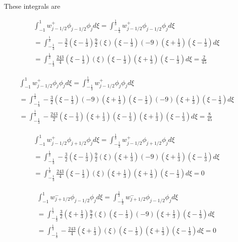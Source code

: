\documentclass[12pt]{article}
\begin{document}
These integrals are

\begin{multline*}
\int_{-1}^{1}w^+_{j - 1/2}\phi_{j - 1/2}\phi_{j} d\xi = \int_{-\frac{1}{3}}^{\frac{1}{3}}w^+_{j - 1/2}\phi_{j - 1/2}\phi_{j} d\xi \\= \int_{-\frac{1}{3}}^{\frac{1}{3}}-\frac{3}{2}\left(\xi - \frac{1}{3}\right) \frac{9}{2}\left(\xi\right)\left(\xi - \frac{1}{3}\right)(-9)\left(\xi + \frac{1}{3}\right)\left(\xi - \frac{1}{3}\right) d\xi \\= \int_{-\frac{1}{3}}^{\frac{1}{3}}\frac{243}{4}\left(\xi - \frac{1}{3}\right) \left(\xi\right)\left(\xi - \frac{1}{3}\right)\left(\xi + \frac{1}{3}\right)\left(\xi - \frac{1}{3}\right) d\xi = \frac{2}{45}
\end{multline*}

\begin{multline*}
\int_{-1}^{1}w^+_{j - 1/2}\phi_{j}\phi_{j} d\xi = \int_{-\frac{1}{3}}^{\frac{1}{3}}w^+_{j - 1/2}\phi_{j}\phi_{j} d\xi \\= \int_{-\frac{1}{3}}^{\frac{1}{3}}-\frac{3}{2}\left(\xi - \frac{1}{3}\right) (-9)\left(\xi + \frac{1}{3}\right)\left(\xi - \frac{1}{3}\right)(-9)\left(\xi + \frac{1}{3}\right)\left(\xi - \frac{1}{3}\right) d\xi \\= \int_{-\frac{1}{3}}^{\frac{1}{3}}-\frac{243}{2}\left(\xi - \frac{1}{3}\right) \left(\xi + \frac{1}{3}\right)\left(\xi - \frac{1}{3}\right)\left(\xi + \frac{1}{3}\right)\left(\xi - \frac{1}{3}\right) d\xi = \frac{8}{45}
\end{multline*}

\begin{multline*}
\int_{-1}^{1}w^+_{j - 1/2}\phi_{j + 1/2}\phi_{j} d\xi = \int_{-\frac{1}{3}}^{\frac{1}{3}}w^+_{j - 1/2}\phi_{j + 1/2}\phi_{j} d\xi \\= \int_{-\frac{1}{3}}^{\frac{1}{3}}-\frac{3}{2}\left(\xi - \frac{1}{3}\right) \frac{9}{2}\left(\xi\right)\left(\xi + \frac{1}{3}\right)(-9)\left(\xi + \frac{1}{3}\right)\left(\xi - \frac{1}{3}\right) d\xi \\= \int_{-\frac{1}{3}}^{\frac{1}{3}}\frac{243}{4}\left(\xi - \frac{1}{3}\right) \left(\xi\right)\left(\xi + \frac{1}{3}\right)\left(\xi + \frac{1}{3}\right)\left(\xi - \frac{1}{3}\right) d\xi = 0
\end{multline*}

%
\begin{multline*}
\int_{-1}^{1}w^-_{j + 1/2}\phi_{j - 1/2}\phi_{j} d\xi = \int_{-\frac{1}{3}}^{\frac{1}{3}}w^-_{j + 1/2}\phi_{j - 1/2}\phi_{j} d\xi \\= \int_{-\frac{1}{3}}^{\frac{1}{3}}\frac{3}{2}\left(\xi + \frac{1}{3}\right) \frac{9}{2}\left(\xi\right)\left(\xi - \frac{1}{3}\right)(-9)\left(\xi + \frac{1}{3}\right)\left(\xi - \frac{1}{3}\right) d\xi \\= \int_{-\frac{1}{3}}^{\frac{1}{3}} -\frac{243}{4}\left(\xi + \frac{1}{3}\right) \left(\xi\right)\left(\xi - \frac{1}{3}\right)\left(\xi + \frac{1}{3}\right)\left(\xi - \frac{1}{3}\right) d\xi = 0
\end{multline*}
\end{document}

